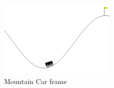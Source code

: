 \begin{figure}[H]
  \centering
  \includegraphics[width=0.5\textwidth]{figures/images/mountain_car_frame.png}
  \caption{Mountain Car frame}
  \label{fig:mountain_car_frame}
\end{figure}
